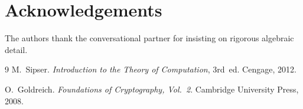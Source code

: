 \documentclass[12pt]{article}
\theoremstyle{definition}
\begin{document}
\section*{Acknowledgements}
The authors thank the conversational partner for insisting on rigorous algebraic detail.


\begin{thebibliography}{9}
M.~Sipser.
\newblock \emph{Introduction to the Theory of Computation}, 3rd~ed.
\newblock Cengage, 2012.

O.~Goldreich.
\newblock \emph{Foundations of Cryptography, Vol.~2}.
\newblock Cambridge University Press, 2008.
\end{thebibliography}
\end{document}
